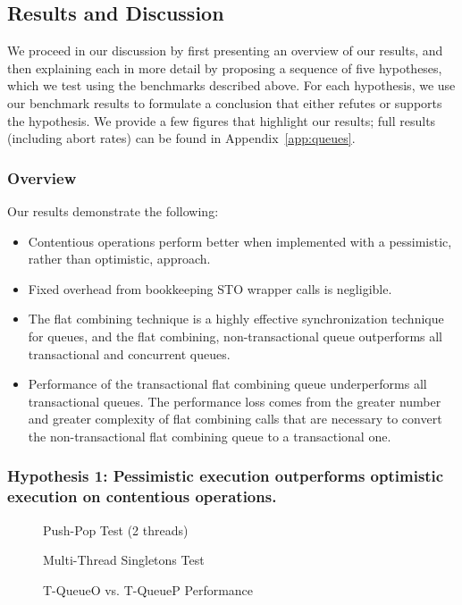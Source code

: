 \subsection{Results and Discussion}

We proceed in our discussion by first presenting an overview of our results, and then explaining each in more detail by proposing a sequence of five hypotheses, which we test using the benchmarks described above. For each hypothesis, we use our benchmark results to formulate a conclusion that either refutes or supports the hypothesis.
We provide a few figures that highlight our results; full results (including abort rates) can be found in Appendix~\ref{app:queues}. 

\subsubsection{Overview}
Our results demonstrate the following:
\begin{itemize}
    \item Contentious operations perform better when implemented with a pessimistic, rather than optimistic, approach.
    \item Fixed overhead from bookkeeping STO wrapper calls is negligible.
    \item The flat combining technique is a highly effective synchronization technique for queues, and the flat combining, non-transactional queue outperforms all transactional and concurrent queues.
    \item Performance of the transactional flat combining queue underperforms all transactional queues. The performance loss comes from the greater number and greater complexity of flat combining calls that are necessary to convert the non-transactional flat combining queue to a transactional one.
\end{itemize}


\subsubsection{Hypothesis 1: Pessimistic execution outperforms optimistic execution on contentious operations.}
\begin{figure}[H]
    \centering
	\begin{minipage}{0.75\textwidth}
        \caption*{Push-Pop Test (2 threads)}
        \vspace{12pt}
	\end{minipage}
	\begin{minipage}{0.75\textwidth}
        \caption*{Multi-Thread Singletons Test}
	\end{minipage}
    \caption{T-QueueO vs. T-QueueP Performance}
    \label{fig:stoqs}
\end{figure}



